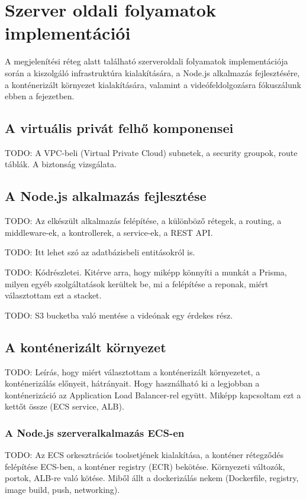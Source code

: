 \chapter{Szerver oldali folyamatok implementációi}

A megjelenítési réteg alatt található szerveroldali folyamatok implementációja során a kiszolgáló infrastruktúra kialakítására, a Node.js alkalmazás fejlesztésére, a konténerizált környezet kialakítására, valamint a videófeldolgozásra fókuszálunk ebben a fejezetben.

\section{A virtuális privát felhő komponensei}

TODO: A VPC-beli (Virtual Private Cloud) subnetek, a security groupok, route táblák. A biztonság vizsgálata.

\section{A Node.js alkalmazás fejlesztése}

TODO: Az elkészült alkalmazás felépítése, a különböző rétegek, a routing, a middleware-ek, a kontrollerek, a service-ek, a REST API.

TODO: Itt lehet szó az adatbázisbeli entitásokról is.

TODO: Kódrészletei. Kitérve arra, hogy miképp könnyíti a munkát a Prisma, milyen egyéb szolgáltatások kerültek be, mi a felépítése a reponak, miért választottam ezt a stacket.

TODO: S3 bucketba való mentése a videónak egy érdekes rész.

\section{A konténerizált környezet}

TODO: Leírás, hogy miért választottam a konténerizált környezetet, a konténerizálás előnyeit, hátrányait. Hogy használható ki a legjobban a konténerizáció az Application Load Balancer-rel együtt. Miképp kapcsoltam ezt a kettőt össze (ECS service, ALB).

\subsection{A Node.js szerveralkalmazás ECS-en}

TODO: Az ECS orkesztrációs toolsetjének kialakítása, a konténer rétegződés felépítése ECS-ben, a konténer registry (ECR) bekötése. Környezeti változók, portok, ALB-re való kötése. Miből állt a dockerizálás nekem (Dockerfile, registry, image build, push, networking).

